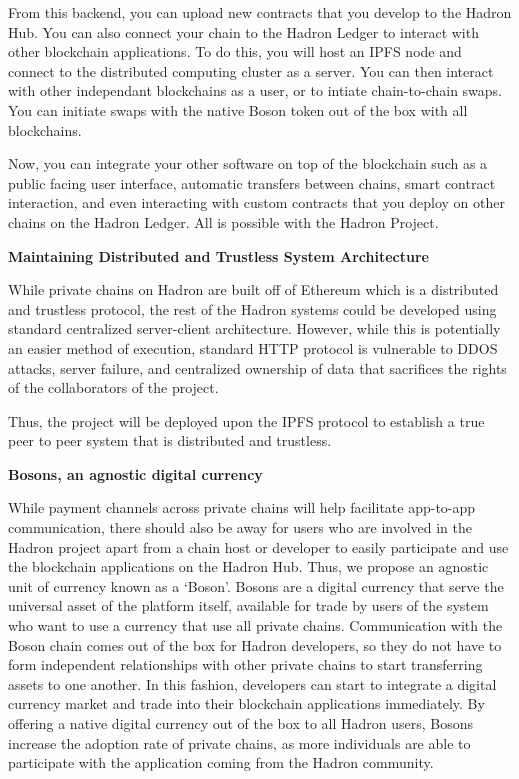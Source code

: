\documentclass{%
	article}
\begin{document}
From this backend, you can upload new contracts that you develop to the Hadron Hub. You can also connect your chain to the Hadron Ledger to interact with other blockchain applications. To do this, you will host an IPFS node and connect to the distributed computing cluster as a server. You can then interact with other independant blockchains as a user, or to intiate chain-to-chain swaps. You can initiate swaps with the native Boson token out of the box with all blockchains.

Now, you can integrate your other software on top of the blockchain such as a public facing user interface, automatic transfers between chains, smart contract interaction, and even interacting with custom contracts that you deploy on other chains on the Hadron Ledger. All is possible with the Hadron Project.

\begin{center}
\textbf{Maintaining Distributed and Trustless System Architecture}
\end{center}

While private chains on Hadron are built off of Ethereum which is a distributed and trustless protocol, the rest of the Hadron systems could be developed using standard centralized server-client architecture. However, while this is potentially an easier method of execution, standard HTTP protocol is vulnerable to DDOS attacks, server failure, and centralized ownership of data that sacrifices the rights of the collaborators of the project\cite{symantecreport}.

Thus, the project will be deployed upon the IPFS protocol to establish a true peer to peer system that is distributed and trustless.

\begin{center}
\textbf{Bosons, an agnostic digital currency}
\end{center}

While payment channels across private chains will help facilitate app-to-app communication, there should also be away for users who are involved in the Hadron project apart from a chain host or developer to easily participate and use the blockchain applications on the Hadron Hub. Thus, we propose an agnostic unit of currency known as a ‘Boson’. Bosons are a digital currency that serve the universal asset of the platform itself, available for trade by users of the system who want to use a currency that use all private chains. Communication with the Boson chain comes out of the box for Hadron developers, so they do not have to form independent relationships with other private chains to start transferring assets to one another. In this fashion, developers can start to integrate a digital currency market and trade into their blockchain applications immediately. By offering a native digital currency out of the box to all Hadron users, Bosons increase the adoption rate of private chains, as more individuals are able to participate with the application coming from the Hadron community.
\end{document}
